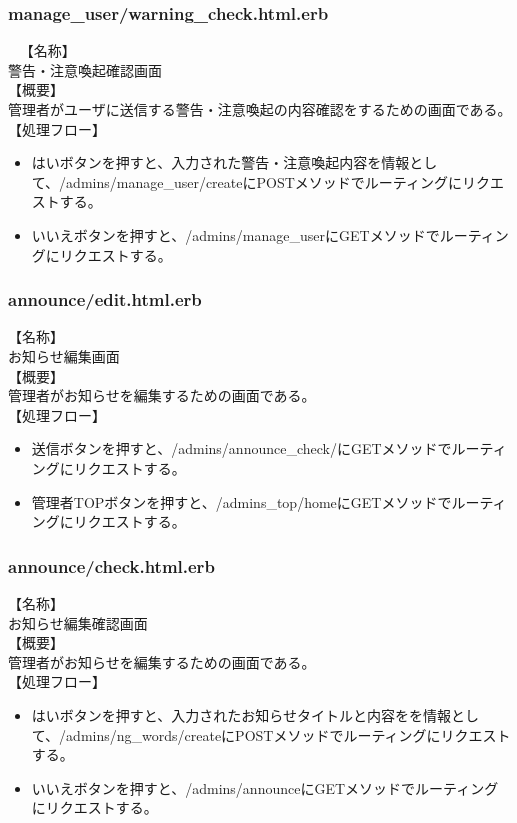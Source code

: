 \documentclass[a4j]{jarticle}
\begin{document}
\subsubsection{manage\_user/warning\_check.html.erb}\
\noindent
【名称】\\
警告・注意喚起確認画面\\
【概要】\\
管理者がユーザに送信する警告・注意喚起の内容確認をするための画面である。\\
【処理フロー】
\begin{itemize}
  \item はいボタンを押すと、入力された警告・注意喚起内容を情報として、/admins/manage\_user/createにPOSTメソッドでルーティングにリクエストする。
  \item いいえボタンを押すと、/admins/manage\_userにGETメソッドでルーティングにリクエストする。
\end{itemize}

\subsubsection{announce/edit.html.erb}
\noindent
【名称】\\
お知らせ編集画面\\
【概要】\\
管理者がお知らせを編集するための画面である。\\
【処理フロー】
\begin{itemize}
  \item 送信ボタンを押すと、/admins/announce\_check/にGETメソッドでルーティングにリクエストする。
  \item 管理者TOPボタンを押すと、/admins\_top/homeにGETメソッドでルーティングにリクエストする。
\end{itemize}

\subsubsection{announce/check.html.erb}
\noindent
【名称】\\
お知らせ編集確認画面\\
【概要】\\
管理者がお知らせを編集するための画面である。\\
【処理フロー】
\begin{itemize}
  \item はいボタンを押すと、入力されたお知らせタイトルと内容をを情報として、/admins/ng\_words/createにPOSTメソッドでルーティングにリクエストする。
  \item いいえボタンを押すと、/admins/announceにGETメソッドでルーティングにリクエストする。
\end{itemize}
\end{document}
